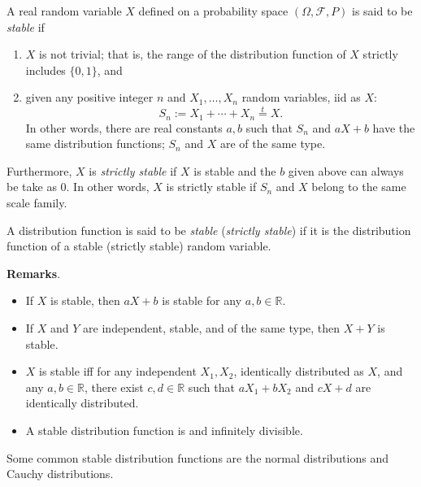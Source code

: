 \documentclass[12pt]{article}
\begin{document}

A real random variable $X$ defined on a probability space $(\Omega, \mathcal{F}, P)$ is said to be \emph{stable} if 
\begin{enumerate}
\item $X$ is not trivial; that is, the range of the distribution function of $X$ strictly includes $\lbrace 0,1\rbrace$, and
\item given any positive integer $n$ and $X_1,\ldots,X_n$ random variables, iid as $X$: $$S_n:=X_1+\cdots +X_n \stackrel{t}{=} X.$$
In other words, there are real constants $a,b$ such that $S_n$ and $aX+b$ have the same distribution functions; $S_n$ and $X$ are of the same type.
\end{enumerate}

Furthermore, $X$ is \emph{strictly stable} if $X$ is stable and the $b$ given above can always be take as $0$.  In other words, $X$ is strictly stable if $S_n$ and $X$ belong to the same scale family.

A distribution function is said to be \emph{stable} (\emph{strictly stable}) if it is the distribution function of a stable (strictly stable) random variable.

\textbf{Remarks}.  
\begin{itemize}
\item If $X$ is stable, then $aX+b$ is stable for any $a,b\in \mathbb{R}$.
\item If $X$ and $Y$ are independent, stable, and of the same type, then $X+Y$ is stable.
\item $X$ is stable iff for any independent $X_1,X_2$, identically distributed as $X$, and any $a,b\in\mathbb{R}$, there exist $c,d\in\mathbb{R}$ such that $aX_1+bX_2$ and $cX+d$ are identically distributed.
\item
A stable distribution function is  and infinitely divisible.
\end{itemize}

Some common stable distribution functions are the normal distributions and Cauchy distributions.
\end{document}
